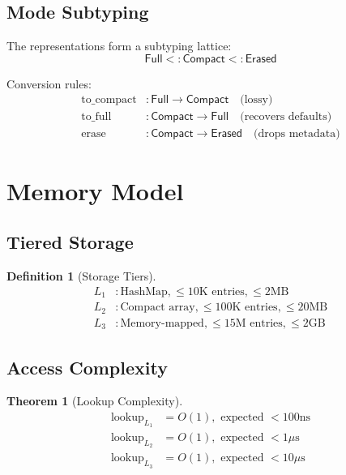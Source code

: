 \documentclass[11pt]{article}
\newtheorem{definition}{Definition}
\newtheorem{theorem}{Theorem}
\newcommand{\Full}{\mathsf{Full}}
\newcommand{\Compact}{\mathsf{Compact}}
\newcommand{\Erased}{\mathsf{Erased}}
\begin{document}
\subsection{Mode Subtyping}

The representations form a subtyping lattice:
\[
\Full <: \Compact <: \Erased
\]

Conversion rules:
\begin{align*}
\text{to\_compact} &: \Full \to \Compact \quad \text{(lossy)} \\
\text{to\_full} &: \Compact \to \Full \quad \text{(recovers defaults)} \\
\text{erase} &: \Compact \to \Erased \quad \text{(drops metadata)}
\end{align*}

\section{Memory Model}

\subsection{Tiered Storage}

\begin{definition}[Storage Tiers]
\begin{align*}
L_1 &: \text{HashMap}, \leq 10\text{K entries}, \leq 2\text{MB} \\
L_2 &: \text{Compact array}, \leq 100\text{K entries}, \leq 20\text{MB} \\
L_3 &: \text{Memory-mapped}, \leq 15\text{M entries}, \leq 2\text{GB}
\end{align*}
\end{definition}

\subsection{Access Complexity}

\begin{theorem}[Lookup Complexity]
\begin{align*}
\text{lookup}_{L_1} &= O(1), \text{ expected } < 100\text{ns} \\
\text{lookup}_{L_2} &= O(1), \text{ expected } < 1\mu\text{s} \\
\text{lookup}_{L_3} &= O(1), \text{ expected } < 10\mu\text{s}
\end{align*}
\end{theorem}
\end{document}
